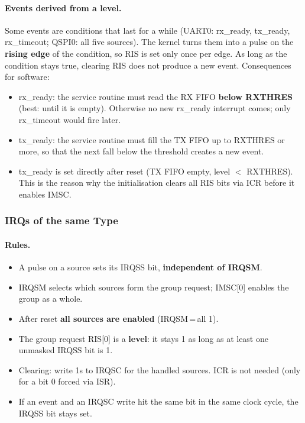 \paragraph{Events derived from a level.}
Some events are conditions that last for a while (UART0: rx\_ready, tx\_ready,
rx\_timeout; QSPI0: all five sources). The kernel turns them into a pulse on the
\textbf{rising edge} of the condition, so RIS is set only once per edge. As long as
the condition stays true, clearing RIS does not produce a new event. Consequences
for software:
\begin{itemize}
  \item rx\_ready: the service routine must read the RX FIFO \textbf{below RXTHRES}
    (best: until it is empty). Otherwise no new rx\_ready interrupt comes; only
    rx\_timeout would fire later.
  \item tx\_ready: the service routine must fill the TX FIFO up to RXTHRES or more,
    so that the next fall below the threshold creates a new event.
  \item tx\_ready is set directly after reset (TX FIFO empty, level $<$ RXTHRES).
    This is the reason why the initialisation clears all RIS bits via ICR before it
    enables IMSC.
\end{itemize}

\subsubsection{IRQs of the same Type}
\label{subsubsec:archirqflowsame}

\paragraph{Rules.}
\begin{itemize}
  \item A pulse on a source sets its IRQSS bit, \textbf{independent of IRQSM}.
  \item IRQSM selects which sources form the group request; IMSC[0] enables the
    group as a whole.
  \item After reset \textbf{all sources are enabled} (IRQSM\,=\,all 1).
  \item The group request RIS[0] is a \textbf{level}: it stays 1 as long as at
    least one unmasked IRQSS bit is 1.
  \item Clearing: write 1s to IRQSC for the handled sources. ICR is not needed
    (only for a bit 0 forced via ISR).
  \item If an event and an IRQSC write hit the same bit in the same clock cycle,
    the IRQSS bit stays set.
\end{itemize}


